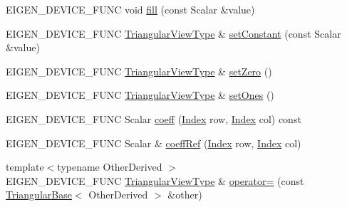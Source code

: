\begin{DoxyCompactItemize}
\item 
E\+I\+G\+E\+N\+\_\+\+D\+E\+V\+I\+C\+E\+\_\+\+F\+U\+NC void \mbox{\hyperlink{class_eigen_1_1_triangular_view_impl_3_01___matrix_type_00_01___mode_00_01_dense_01_4_ad4093c8ecb74b7eb0567d1161bcc9964}{fill}} (const Scalar \&value)
\item 
E\+I\+G\+E\+N\+\_\+\+D\+E\+V\+I\+C\+E\+\_\+\+F\+U\+NC \mbox{\hyperlink{class_eigen_1_1_triangular_view}{Triangular\+View\+Type}} \& \mbox{\hyperlink{class_eigen_1_1_triangular_view_impl_3_01___matrix_type_00_01___mode_00_01_dense_01_4_aae1460a593106b7e22fad56ce2c3c957}{set\+Constant}} (const Scalar \&value)
\item 
E\+I\+G\+E\+N\+\_\+\+D\+E\+V\+I\+C\+E\+\_\+\+F\+U\+NC \mbox{\hyperlink{class_eigen_1_1_triangular_view}{Triangular\+View\+Type}} \& \mbox{\hyperlink{class_eigen_1_1_triangular_view_impl_3_01___matrix_type_00_01___mode_00_01_dense_01_4_a27ea7bd66892206be3a0c7a1195fec14}{set\+Zero}} ()
\item 
E\+I\+G\+E\+N\+\_\+\+D\+E\+V\+I\+C\+E\+\_\+\+F\+U\+NC \mbox{\hyperlink{class_eigen_1_1_triangular_view}{Triangular\+View\+Type}} \& \mbox{\hyperlink{class_eigen_1_1_triangular_view_impl_3_01___matrix_type_00_01___mode_00_01_dense_01_4_a39d202f5efbf14179ca30435c9dc04b5}{set\+Ones}} ()
\item 
E\+I\+G\+E\+N\+\_\+\+D\+E\+V\+I\+C\+E\+\_\+\+F\+U\+NC Scalar \mbox{\hyperlink{class_eigen_1_1_triangular_view_impl_3_01___matrix_type_00_01___mode_00_01_dense_01_4_a906168fa5121cfe301bc801df50807ad}{coeff}} (\mbox{\hyperlink{struct_eigen_1_1_eigen_base_a554f30542cc2316add4b1ea0a492ff02}{Index}} row, \mbox{\hyperlink{struct_eigen_1_1_eigen_base_a554f30542cc2316add4b1ea0a492ff02}{Index}} col) const
\item 
E\+I\+G\+E\+N\+\_\+\+D\+E\+V\+I\+C\+E\+\_\+\+F\+U\+NC Scalar \& \mbox{\hyperlink{class_eigen_1_1_triangular_view_impl_3_01___matrix_type_00_01___mode_00_01_dense_01_4_a451953e43fc2e9231f05e7926d0e9d98}{coeff\+Ref}} (\mbox{\hyperlink{struct_eigen_1_1_eigen_base_a554f30542cc2316add4b1ea0a492ff02}{Index}} row, \mbox{\hyperlink{struct_eigen_1_1_eigen_base_a554f30542cc2316add4b1ea0a492ff02}{Index}} col)
\item 
{\footnotesize template$<$typename Other\+Derived $>$ }\\E\+I\+G\+E\+N\+\_\+\+D\+E\+V\+I\+C\+E\+\_\+\+F\+U\+NC \mbox{\hyperlink{class_eigen_1_1_triangular_view}{Triangular\+View\+Type}} \& \mbox{\hyperlink{class_eigen_1_1_triangular_view_impl_3_01___matrix_type_00_01___mode_00_01_dense_01_4_a96678cc05b6aa574e91a07717fea1344}{operator=}} (const \mbox{\hyperlink{class_eigen_1_1_triangular_base}{Triangular\+Base}}$<$ Other\+Derived $>$ \&other)

\end{DoxyCompactItemize}
